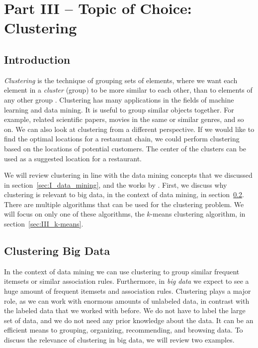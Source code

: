 \documentclass[../main.tex]{subfiles}
\begin{document}

\section*{Part III -- Topic of Choice: Clustering}
\setcounter{section}{3}
\setcounter{subsection}{0}

\subsection{Introduction}
\label{sec:III_intro}

\emph{Clustering} is the technique of grouping sets of elements,
where we want each element in a \emph{cluster} (group) to be more similar to each other,
than to elements of any other group \cite{Jain1999}.
Clustering has many applications in the fields of machine learning and data mining.
It is useful to group similar objects together.
For example, related scientific papers, movies in the same or similar genres, and so on.
We can also look at clustering from a different perspective.
If we would like to find the optimal locations for a restaurant chain,
we could perform clustering based on the locations of potential customers.
The center of the clusters can be used as a suggested location for a restaurant.

We will review clustering in line with the data mining concepts that we discussed in section~\ref{sec:I_data_mining},
and the works by \citeauthor{Riondato2012} \cite{Riondato2012, Riondato2015}.
First, we discuss why clustering is relevant to big data, in the context of data mining, in section~\ref{sec:III_clustering_big_data}.
There are multiple algorithms \cite{Jain1999} that can be used for the clustering problem.
We will focus on only one of these algorithms, the $k$-means clustering algorithm, in section~\ref{sec:III_k-means}.


\subsection{Clustering Big Data}
\label{sec:III_clustering_big_data}


In the context of data mining we can use clustering to group similar frequent itemsets or similar association rules.
Furthermore, in \emph{big data} we expect to see a huge amount of frequent itemsets and association rules.
Clustering plays a major role, as we can work with enormous amounts of unlabeled data,
in contrast with the labeled data that we worked with before.
We do not have to label the large set of data, and we do not need any prior knowledge about the data.
It can be an efficient means to grouping, organizing, recommending, and browsing data.
To discuss the relevance of clustering in big data, we will review two examples.
\end{document}
